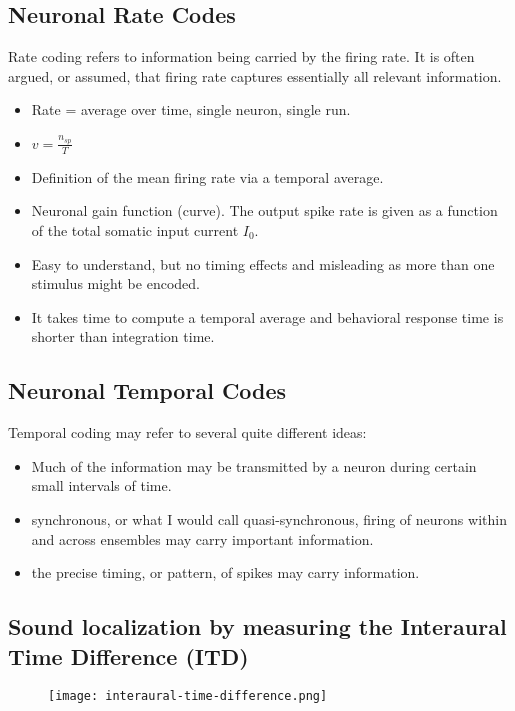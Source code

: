 \documentclass[main]{subfiles}
\begin{document}
\subsection{Neuronal Rate Codes}
Rate coding refers to information being carried by the firing rate. It is often
argued, or assumed, that firing rate captures essentially all relevant information.

\begin{itemize}[noitemsep,nolistsep]
	\item Rate = average over time, single neuron, single run.
	\item $v = \frac{n_{sp}}{T}$
	\item Definition of the mean firing rate via a temporal average.
	\item Neuronal gain function (curve). The output spike rate is given as a function of the total somatic input current $I_0$.
	\item Easy to understand, but no timing effects and misleading as more than one stimulus might be encoded.
	\item It takes time to compute a temporal average and behavioral response time is shorter than integration time.
\end{itemize}

\subsection{Neuronal Temporal Codes}
Temporal coding may refer to several quite different ideas:
\begin{itemize}
\item Much of the information may be transmitted by a neuron during certain small intervals of time.
\item synchronous, or what I would call quasi-synchronous, firing of neurons within and across ensembles may carry important information.
\item the precise timing, or pattern, of spikes may carry information.
\end{itemize}

\subsection{Sound localization by measuring  the Interaural Time Difference (ITD)}

\begin{figure}[H]
	\centering
	\texttt{[image: interaural-time-difference.png]}
\end{figure}
\end{document}
